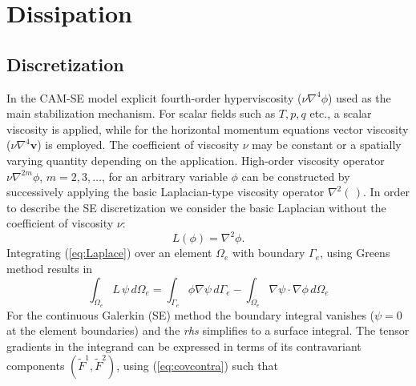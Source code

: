 \documentclass{agujournal}
\begin{document}

%
%
%
%
\appendix
   \section{Dissipation}\label{sec:dissipation}
   \subsection{Discretization}
   In the CAM-SE model explicit  fourth-order hyperviscosity  ($\nu \nabla^4 \phi$) used as 
    the main stabilization mechanism.  For scalar fields such as $T, p, q$ etc., 
   a scalar viscosity   is applied,  while  for the horizontal momentum equations vector viscosity
   ($\nu \nabla^4 \mathbf{v} $) is employed. The coefficient of viscosity $\nu$ may be constant or a spatially varying 
  quantity  depending on the application. High-order viscosity operator $ \nu \nabla^{2m} \phi$, $m=2,3, \dots$, 
    for an arbitrary variable $\phi$  can be constructed 
  by successively applying the basic Laplacian-type viscosity operator $\nabla^2 ( \,)$. In order to describe the SE discretization 
  we consider the basic Laplacian without the coefficient of viscosity $\nu$: 
   \begin{equation}
   L(\phi)  = \nabla^2 \phi .  \label{eq:Laplace}
   \end{equation}
  Integrating  (\ref{eq:Laplace}) over an element $\Omega_e$  with boundary $\Gamma_e$, using Greens method   results in 
    \begin{equation}
  \int_{\Omega_e}  L \, \psi  \,  d \Omega_e  =   \int_{\Gamma_e}  \phi \nabla \psi  \,    d  \Gamma_e - 
                      \int_{\Omega_e}  \nabla \psi \cdot \nabla \phi \,  d \Omega_e  \label{eq:Lweak}
   \end{equation}
   For the continuous Galerkin (SE) method the boundary integral vanishes ($\psi = 0$ at the element boundaries) 
   and the  {\em  rhs} simplifies to 
   a surface integral.   The tensor gradients in the integrand  can be expressed  in terms of its contravariant  components 
   $(\tilde{F}^1, \tilde{F}^2)$, using (\ref{eq:covcontra}) such that 
\end{document}
